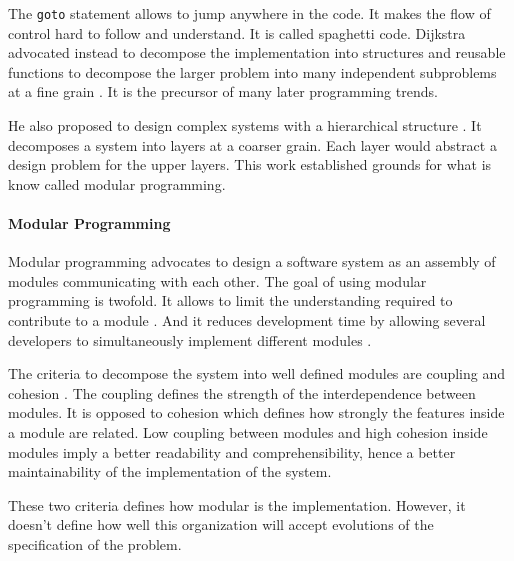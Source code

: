 The \texttt{goto} statement allows to jump anywhere in the code.
It makes the flow of control hard to follow and understand.
It is called spaghetti code.
Dijkstra advocated instead to decompose the implementation into structures and reusable functions to decompose the larger problem into many independent subproblems at a fine grain \cite{Dijkstra1968a}.
It is the precursor of many later programming trends.


He also proposed to design complex systems with a hierarchical structure \cite{Dijkstra1968}.
It decomposes a system into layers at a coarser grain.
Each layer would abstract a design problem for the upper layers.
This work established grounds for what is know called modular programming.


\paragraph{Modular Programming}

Modular programming advocates to design a software system as an assembly of modules communicating with each other.
The goal of using modular programming is twofold.
It allows to limit the understanding required to contribute to a module \cite{Stevens1974}.
And it reduces development time by allowing several developers to simultaneously implement different modules \cite{Wong2009,Cataldo2006}.

The criteria to decompose the system into well defined modules are coupling and cohesion \cite{Stevens1974}.
The coupling defines the strength of the interdependence between modules.
It is opposed to cohesion which defines how strongly the features inside a module are related.
Low coupling between modules and high cohesion inside modules imply a better readability and comprehensibility, hence a better maintainability of the implementation of the system.

These two criteria defines how modular is the implementation.
However, it doesn't define how well this organization will accept evolutions of the specification of the problem.

